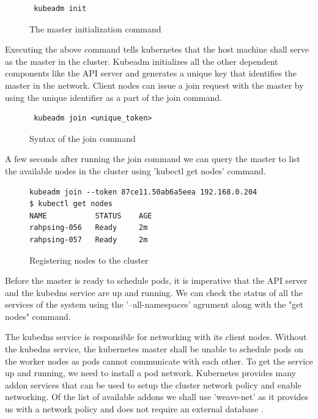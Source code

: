 \documentclass[9pt,twocolumn,twoside]{../../styles/osajnl}
\begin{document}
\begin{figure}[H]
\begin{verbatim}
 kubeadm init
\end{verbatim}
\caption{The master initialization command}
\label{The master initialization command}
\end{figure}

Executing the above command tells kubernetes that the host machine
shall serve as the master in the cluster. Kubeadm initializes all the
other dependent components like the API server and generates a unique
key that identifies the master in the network. Client nodes can issue
a join request with the master by using the unique identifier as a
part of the join command.

\begin{figure}[H]
\begin{verbatim}
 kubeadm join <unique_token>
\end{verbatim}
\caption{Syntax of the join command}
\label{Syntax of the join command}
\end{figure}

A few seconds after running the join command we can query the master
to list the available nodes in the cluster using 'kubectl get nodes' command.

\begin{figure}[H]
\begin{verbatim}
kubeadm join --token 87ce11.50ab6a5eea 192.168.0.204
$ kubectl get nodes
NAME           STATUS    AGE
rahpsing-056   Ready     2m
rahpsing-057   Ready     2m
\end{verbatim}
\caption{Registering nodes to the cluster}
\label{Registering nodes to the cluster}
\end{figure}

Before the master is ready to schedule pods, it is imperative that the
API server and the kubedns service are up and running. We can check
the status of all the services of the system using the
'--all-namespaces' agrument along with the "get nodes" command.

The kubedns service is responsible for networking with its client
nodes. Without the kubedns service, the kubernetes master shall be
unable to schedule pods on the worker nodes as pods cannot communicate
with each other. To get the service up and running, we need to install
a pod network.  Kubernetes provides many addon services that can be
used to setup the cluster network policy and enable networking. Of the
list of available addons we shall use 'weave-net' as it provides us
with a network policy and does not require an external database
\cite{www-kubernetes-addons}.
\end{document}
